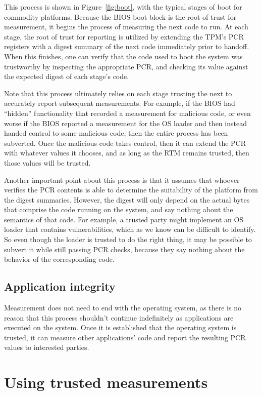 \documentclass[11pt,twoside]{scrartcl}
\begin{document}
This process is shown in Figure~\ref{fig:boot}, with the typical stages of boot for commodity platforms. Because the BIOS boot block is the root of trust for measurement, it begins the process of measuring the next code to run. At each stage, the root of trust for reporting is utilized by extending the TPM's PCR registers with a digest summary of the next code immediately prior to handoff. When this finishes, one can verify that the code used to boot the system was trustworthy by inspecting the appropriate PCR, and checking its value against the expected digest of each stage's code.

Note that this process ultimately relies on each stage trusting the next to accurately report subsequent measurements. For example, if the BIOS had ``hidden'' functionality that recorded a measurement for malicious code, or even worse if the BIOS reported a measurement for the OS loader and then instead handed control to some malicious code, then the entire process has been subverted. Once the malicious code takes control, then it can extend the PCR with whatever values it chooses, and as long as the RTM remains trusted, then those values will be trusted.

Another important point about this process is that it assumes that whoever verifies the PCR contents is able to determine the suitability of the platform from the digest summaries. However, the digest will only depend on the actual bytes that comprise the code running on the system, and say nothing about the semantics of that code. For example, a trusted party might implement an OS loader that contains vulnerabilities, which as we know can be difficult to identify. So even though the loader is trusted to do the right thing, it may be possible to subvert it while still passing PCR checks, because they say nothing about the behavior of the corresponding code.

\subsection{Application integrity}

Measurement does not need to end with the operating system, as there is no reason that this process shouldn't continue indefinitely as applications are executed on the system. Once it is established that the operating system is trusted, it can measure other applications' code and report the resulting PCR values to interested parties.

\section{Using trusted measurements}
\end{document}
